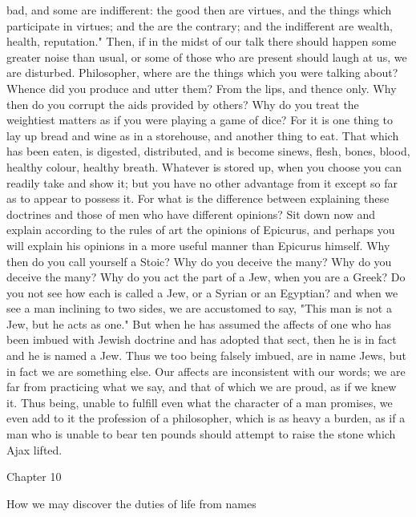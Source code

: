 \documentclass[a4paper]{article}
\begin{document}
bad, and some are indifferent: the good then are virtues, and the things which
participate in virtues; and the are the contrary; and the indifferent are
wealth, health, reputation." Then, if in the midst of our talk there should
happen some greater noise than usual, or some of those who are present should
laugh at us, we are disturbed. Philosopher, where are the things which you were
talking about? Whence did you produce and utter them? From the lips, and thence
only. Why then do you corrupt the aids provided by others? Why do you treat the
weightiest matters as if you were playing a game of dice? For it is one thing
to lay up bread and wine as in a storehouse, and another thing to eat. That
which has been eaten, is digested, distributed, and is become sinews, flesh,
bones, blood, healthy colour, healthy breath. Whatever is stored up, when you
choose you can readily take and show it; but you have no other advantage from
it except so far as to appear to possess it. For what is the difference between
explaining these doctrines and those of men who have different opinions? Sit
down now and explain according to the rules of art the opinions of Epicurus,
and perhaps you will explain his opinions in a more useful manner than Epicurus
himself. Why then do you call yourself a Stoic? Why do you deceive the many?
Why do you deceive the many? Why do you act the part of a Jew, when you are a
Greek? Do you not see how each is called a Jew, or a Syrian or an Egyptian? and
when we see a man inclining to two sides, we are accustomed to say, "This man
is not a Jew, but he acts as one." But when he has assumed the affects of one
who has been imbued with Jewish doctrine and has adopted that sect, then he is
in fact and he is named a Jew. Thus we too being falsely imbued, are in name
Jews, but in fact we are something else. Our affects are inconsistent with our
words; we are far from practicing what we say, and that of which we are proud,
as if we knew it. Thus being, unable to fulfill even what the character of a
man promises, we even add to it the profession of a philosopher, which is as
heavy a burden, as if a man who is unable to bear ten pounds should attempt to
raise the stone which Ajax lifted.

Chapter 10

How we may discover the duties of life from names
\end{document}
